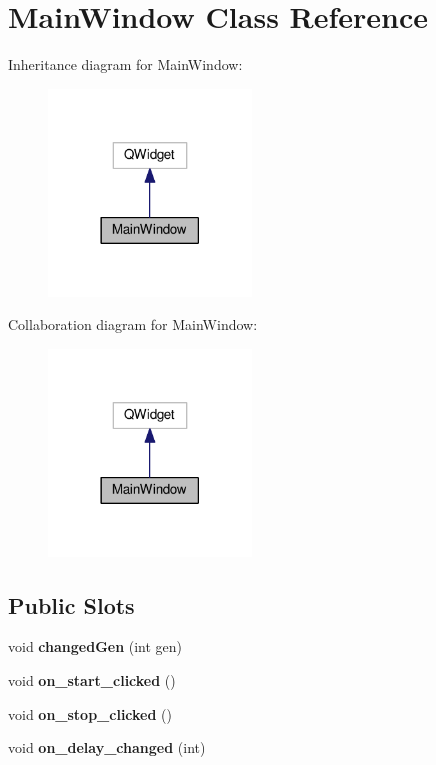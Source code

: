 \hypertarget{classMainWindow}{}\section{Main\+Window Class Reference}
\label{classMainWindow}


Inheritance diagram for Main\+Window\+:
\nopagebreak
\begin{figure}[H]
\begin{center}
\leavevmode
\includegraphics[width=153pt]{classMainWindow__inherit__graph}
\end{center}
\end{figure}


Collaboration diagram for Main\+Window\+:
\nopagebreak
\begin{figure}[H]
\begin{center}
\leavevmode
\includegraphics[width=153pt]{classMainWindow__coll__graph}
\end{center}
\end{figure}
\subsection*{Public Slots}
\begin{DoxyCompactItemize}
\item 
\mbox{\label{classMainWindow_a7b7807cad6963c4b45483ae68256ea91}} 
void {\bfseries changed\+Gen} (int gen)
\item 
\mbox{\label{classMainWindow_ae66e9ab15f911b93fce0f161d2fde880}} 
void {\bfseries on\+\_\+start\+\_\+clicked} ()
\item 
\mbox{\label{classMainWindow_ac22e784eff724fc28b1c22aa65c4317d}} 
void {\bfseries on\+\_\+stop\+\_\+clicked} ()
\item 
\mbox{\label{classMainWindow_a16b98f4e4bc7ff612f2aa7c1eeb70d15}} 
void {\bfseries on\+\_\+delay\+\_\+changed} (int)
\end{DoxyCompactItemize}
